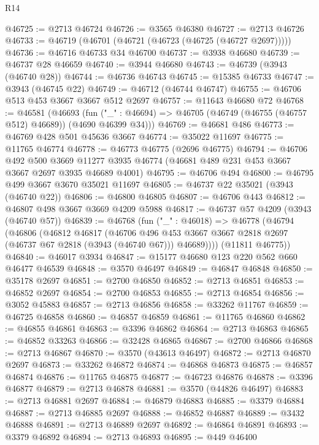 \begin{lexlean}{R14}
\begin{coremodule}
@46725 := @2713 @46724
@46726 := @3565 @46380
@46727 := @2713 @46726
@46733 := @46719 (@46701 (@46721 (@46723 (@46725 (@46727 @2697)))))
@46736 := @46716 @46733 @34 @46700
@46737 := @3938 @46680
@46739 := @46737 @28 @46659
@46740 := @3944 @46680
@46743 := @46739 (@3943 (@46740 @28))
@46744 := @46736 @46743
@46745 := @15385 @46733
@46747 := @3943 (@46745 @22)
@46749 := @46712 (@46744 @46747)
@46755 := @46706 @513 @453 @3667 @3667 @512 @2697
@46757 := @11643 @46680 @72
@46768 := @46581
    (@46693
      (fun ("_" : @46694) => @46705 (@46749 (@46755 (@46757 @512) @46689)) (@4690 @46399 @34)))
@46769 := @46681 @486
@46773 := @46769 @428 @501 @45636 @3667
@46774 := @35022 @11697
@46775 := @11765 @46774
@46778 := @46773 @46775 (@2696 @46775)
@46794 := @46706
    @492
    @500
    @3669
    @11277
    @3935
    @46774
    (@46681 @489 @231 @453 @3667 @3667 @2697 @3935 @46689 @4001)
@46795 := @46706 @494
@46800 := @46795 @499 @3667 @3670 @35021 @11697
@46805 := @46737 @22 @35021 (@3943 (@46740 @22))
@46806 := @46800 @46805
@46807 := @46706 @443
@46812 := @46807 @498 @3667 @3669 @4209 @5988
@46817 := @46737 @57 @4209 (@3943 (@46740 @57))
@46839 := @46768
    (fun ("_" : @46018) =>
    @46778
      (@46794
        (@46806
          (@46812
            @46817
            (@46706
              @496
              @453
              @3667
              @3667
              @2818
              @2697
              (@46737 @67 @2818 (@3943 (@46740 @67)))
              @46689))))
      (@11811 @46775))
@46840 := @46017 @3934
@46847 := @15177 @46680 @123 @220 @562 @660 @46477 @46539
@46848 := @3570 @46497
@46849 := @46847 @46848
@46850 := @35178 @2697
@46851 := @2700 @46850
@46852 := @2713 @46851
@46853 := @46852 @2697
@46854 := @2700 @46853
@46855 := @2713 @46854
@46856 := @3052 @45883
@46857 := @2713 @46856
@46858 := @33262 @11767
@46859 := @46725 @46858
@46860 := @46857 @46859
@46861 := @11765 @46860
@46862 := @46855 @46861
@46863 := @3396 @46862
@46864 := @2713 @46863
@46865 := @46852 @33263
@46866 := @32428 @46865
@46867 := @2700 @46866
@46868 := @2713 @46867
@46870 := @3570 (@43613 @46497)
@46872 := @2713 @46870 @2697
@46873 := @33262 @46872
@46874 := @46868 @46873
@46875 := @46857 @46874
@46876 := @11765 @46875
@46877 := @46723 @46876
@46878 := @3396 @46877
@46879 := @2713 @46878
@46881 := @3570 (@44826 @46497)
@46883 := @2713 @46881 @2697
@46884 := @46879 @46883
@46885 := @3379 @46884
@46887 := @2713 @46885 @2697
@46888 := @46852 @46887
@46889 := @3432 @46888
@46891 := @2713 @46889 @2697
@46892 := @46864 @46891
@46893 := @3379 @46892
@46894 := @2713 @46893
@46895 := @449 @46400

\end{coremodule}
\end{lexlean}

